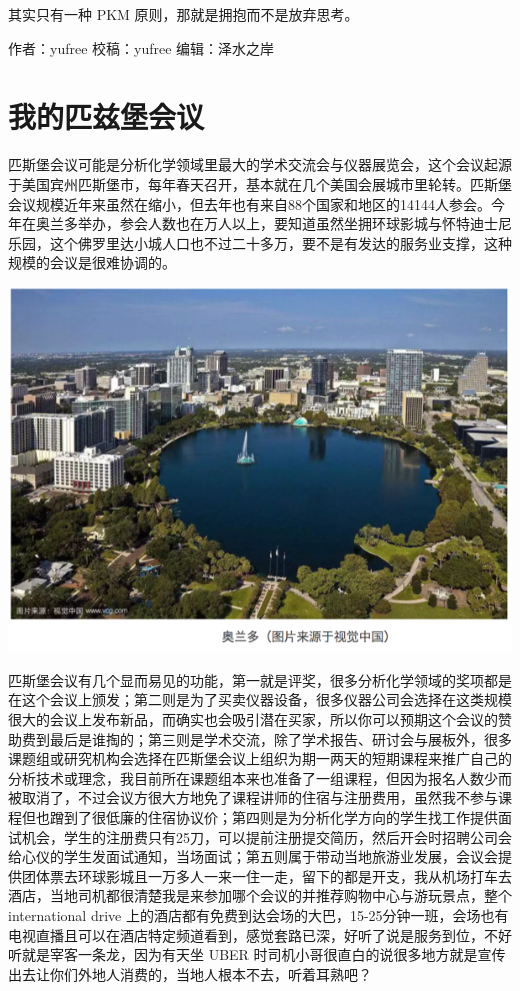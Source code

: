 \documentclass[]{book}
\begin{document}
其实只有一种 PKM 原则，那就是拥抱而不是放弃思考。

作者：yufree 校稿：yufree 编辑：泽水之岸

\section{我的匹兹堡会议}

匹斯堡会议可能是分析化学领域里最大的学术交流会与仪器展览会，这个会议起源于美国宾州匹斯堡市，每年春天召开，基本就在几个美国会展城市里轮转。匹斯堡会议规模近年来虽然在缩小，但去年也有来自88个国家和地区的14144人参会。今年在奥兰多举办，参会人数也在万人以上，要知道虽然坐拥环球影城与怀特迪士尼乐园，这个佛罗里达小城人口也不过二十多万，要不是有发达的服务业支撑，这种规模的会议是很难协调的。

\includegraphics[width=8.33in]{images/pittcon1}

匹斯堡会议有几个显而易见的功能，第一就是评奖，很多分析化学领域的奖项都是在这个会议上颁发；第二则是为了买卖仪器设备，很多仪器公司会选择在这类规模很大的会议上发布新品，而确实也会吸引潜在买家，所以你可以预期这个会议的赞助费到最后是谁掏的；第三则是学术交流，除了学术报告、研讨会与展板外，很多课题组或研究机构会选择在匹斯堡会议上组织为期一两天的短期课程来推广自己的分析技术或理念，我目前所在课题组本来也准备了一组课程，但因为报名人数少而被取消了，不过会议方很大方地免了课程讲师的住宿与注册费用，虽然我不参与课程但也蹭到了很低廉的住宿协议价；第四则是为分析化学方向的学生找工作提供面试机会，学生的注册费只有25刀，可以提前注册提交简历，然后开会时招聘公司会给心仪的学生发面试通知，当场面试；第五则属于带动当地旅游业发展，会议会提供团体票去环球影城且一万多人一来一住一走，留下的都是开支，我从机场打车去酒店，当地司机都很清楚我是来参加哪个会议的并推荐购物中心与游玩景点，整个
international drive
上的酒店都有免费到达会场的大巴，15-25分钟一班，会场也有电视直播且可以在酒店特定频道看到，感觉套路已深，好听了说是服务到位，不好听就是宰客一条龙，因为有天坐
UBER
时司机小哥很直白的说很多地方就是宣传出去让你们外地人消费的，当地人根本不去，听着耳熟吧？
\end{document}
